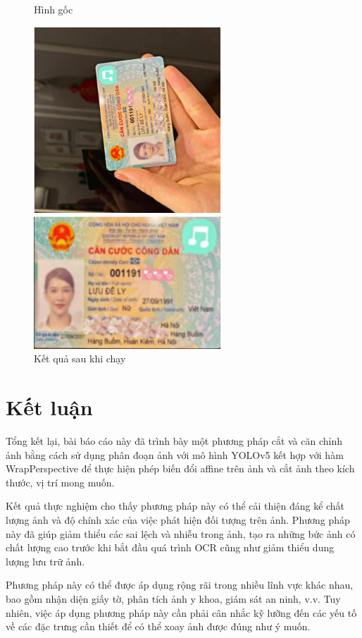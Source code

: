 \documentclass [10pt, fancyhdr, twoside] {article}
\begin{document}
\begin{figure}[!htb]
    \begin{minipage}{0.48\textwidth}
      \caption{Hình gốc}
      \centering
      \includegraphics[width=7cm]{Picture6.png}
    \end{minipage}\hfill
    \begin{minipage}{0.48\textwidth}
      \centering
      \caption{Kết quả sau khi chạy}
      \includegraphics[width=7cm]{Picture7.png}
    \end{minipage}
 \end{figure}

\section{Kết luận}
Tổng kết lại, bài báo cáo này đã trình bày một phương pháp cắt và căn chỉnh ảnh bằng cách sử dụng phân đoạn ảnh với mô hình YOLOv5 kết hợp với hàm WrapPerspective để thực hiện phép biến đổi affine trên ảnh và cắt ảnh theo kích thước, vị trí mong muốn.

Kết quả thực nghiệm cho thấy phương pháp này có thể cải thiện đáng kể chất lượng ảnh và độ chính xác của việc phát hiện đối tượng trên ảnh. Phương pháp này đã giúp giảm thiểu các sai lệch và nhiễu trong ảnh, tạo ra những bức ảnh có chất lượng cao trước khi bắt đầu quá trình OCR cũng như giảm thiểu dung lượng lưu trữ ảnh.

Phương pháp này có thể được áp dụng rộng rãi trong nhiều lĩnh vực khác nhau, bao gồm nhận diện giấy tờ, phân tích ảnh y khoa, giám sát an ninh, v.v. Tuy nhiên, việc áp dụng phương pháp này cần phải cân nhắc kỹ lưỡng đến các yếu tố về các đặc trưng cần thiết để có thể xoay ảnh được đúng như ý muốn.
\end{document}

